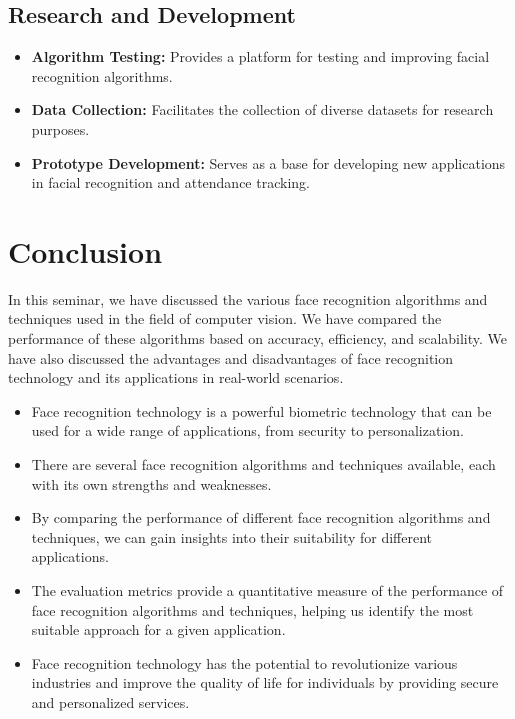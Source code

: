 \documentclass[openany]{report}
\begin{document}
\section{Research and Development}
\begin{itemize}
    \item \textbf{Algorithm Testing:} Provides a platform for testing and improving facial recognition algorithms.
    \item \textbf{Data Collection:} Facilitates the collection of diverse datasets for research purposes.
    \item \textbf{Prototype Development:} Serves as a base for developing new applications in facial recognition and attendance tracking.
\end{itemize}

\chapter{Conclusion}
In this seminar, we have discussed the various face recognition algorithms and techniques used in the field of computer vision. We have compared the performance of these algorithms based on accuracy, efficiency, and scalability. We have also discussed the advantages and disadvantages of face recognition technology and its applications in real-world scenarios.

\begin{itemize}
    \item Face recognition technology is a powerful biometric technology that can be used for a wide range of applications, from security to personalization.
    \item There are several face recognition algorithms and techniques available, each with its own strengths and weaknesses.
    \item By comparing the performance of different face recognition algorithms and techniques, we can gain insights into their suitability for different applications.
    \item The evaluation metrics provide a quantitative measure of the performance of face recognition algorithms and techniques, helping us identify the most suitable approach for a given application.
    \item Face recognition technology has the potential to revolutionize various industries and improve the quality of life for individuals by providing secure and personalized services.
\end{itemize}
\clearpage
\end{document}
